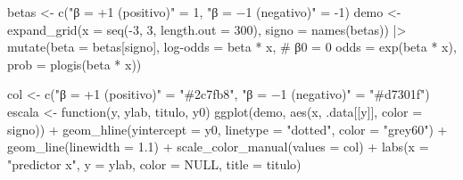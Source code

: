 \documentclass[
  letterpaper,
  DIV=11,
  numbers=noendperiod]{scrartcl}
\newenvironment{Shaded}{\begin{snugshade}}{\end{snugshade}}
\newcommand{\AttributeTok}[1]{\textcolor[rgb]{0.40,0.45,0.13}{#1}}
\newcommand{\CommentTok}[1]{\textcolor[rgb]{0.37,0.37,0.37}{#1}}
\newcommand{\ConstantTok}[1]{\textcolor[rgb]{0.56,0.35,0.01}{#1}}
\newcommand{\ControlFlowTok}[1]{\textcolor[rgb]{0.00,0.23,0.31}{#1}}
\newcommand{\DecValTok}[1]{\textcolor[rgb]{0.68,0.00,0.00}{#1}}
\newcommand{\FloatTok}[1]{\textcolor[rgb]{0.68,0.00,0.00}{#1}}
\newcommand{\FunctionTok}[1]{\textcolor[rgb]{0.28,0.35,0.67}{#1}}
\newcommand{\NormalTok}[1]{\textcolor[rgb]{0.00,0.23,0.31}{#1}}
\newcommand{\OtherTok}[1]{\textcolor[rgb]{0.00,0.23,0.31}{#1}}
\newcommand{\SpecialCharTok}[1]{\textcolor[rgb]{0.37,0.37,0.37}{#1}}
\newcommand{\StringTok}[1]{\textcolor[rgb]{0.13,0.47,0.30}{#1}}
\begin{document}
\begin{Shaded}
\begin{Highlighting}[]
\NormalTok{betas }\OtherTok{\textless{}{-}} \FunctionTok{c}\NormalTok{(}\StringTok{"β = +1 (positivo)"} \OtherTok{=} \DecValTok{1}\NormalTok{, }\StringTok{"β = −1 (negativo)"} \OtherTok{=} \SpecialCharTok{{-}}\DecValTok{1}\NormalTok{)}
\NormalTok{demo }\OtherTok{\textless{}{-}} \FunctionTok{expand\_grid}\NormalTok{(}\AttributeTok{x =} \FunctionTok{seq}\NormalTok{(}\SpecialCharTok{{-}}\DecValTok{3}\NormalTok{, }\DecValTok{3}\NormalTok{, }\AttributeTok{length.out =} \DecValTok{300}\NormalTok{), }\AttributeTok{signo =} \FunctionTok{names}\NormalTok{(betas)) }\SpecialCharTok{|\textgreater{}}
  \FunctionTok{mutate}\NormalTok{(}\AttributeTok{beta =}\NormalTok{ betas[signo],}
         \StringTok{\textasciigrave{}}\AttributeTok{log{-}odds}\StringTok{\textasciigrave{}} \OtherTok{=}\NormalTok{ beta }\SpecialCharTok{*}\NormalTok{ x,          }\CommentTok{\# β0 = 0}
         \AttributeTok{odds       =} \FunctionTok{exp}\NormalTok{(beta }\SpecialCharTok{*}\NormalTok{ x),}
         \AttributeTok{prob       =} \FunctionTok{plogis}\NormalTok{(beta }\SpecialCharTok{*}\NormalTok{ x))}

\NormalTok{col }\OtherTok{\textless{}{-}} \FunctionTok{c}\NormalTok{(}\StringTok{"β = +1 (positivo)"} \OtherTok{=} \StringTok{"\#2c7fb8"}\NormalTok{, }\StringTok{"β = −1 (negativo)"} \OtherTok{=} \StringTok{"\#d7301f"}\NormalTok{)}
\NormalTok{escala }\OtherTok{\textless{}{-}} \ControlFlowTok{function}\NormalTok{(y, ylab, titulo, y0)}
  \FunctionTok{ggplot}\NormalTok{(demo, }\FunctionTok{aes}\NormalTok{(x, .data[[y]], }\AttributeTok{color =}\NormalTok{ signo)) }\SpecialCharTok{+}
    \FunctionTok{geom\_hline}\NormalTok{(}\AttributeTok{yintercept =}\NormalTok{ y0, }\AttributeTok{linetype =} \StringTok{"dotted"}\NormalTok{, }\AttributeTok{color =} \StringTok{"grey60"}\NormalTok{) }\SpecialCharTok{+}
    \FunctionTok{geom\_line}\NormalTok{(}\AttributeTok{linewidth =} \FloatTok{1.1}\NormalTok{) }\SpecialCharTok{+}
    \FunctionTok{scale\_color\_manual}\NormalTok{(}\AttributeTok{values =}\NormalTok{ col) }\SpecialCharTok{+}
    \FunctionTok{labs}\NormalTok{(}\AttributeTok{x =} \StringTok{"predictor x"}\NormalTok{, }\AttributeTok{y =}\NormalTok{ ylab, }\AttributeTok{color =} \ConstantTok{NULL}\NormalTok{, }\AttributeTok{title =}\NormalTok{ titulo)}


\end{Highlighting}
\end{Shaded}
\end{document}
